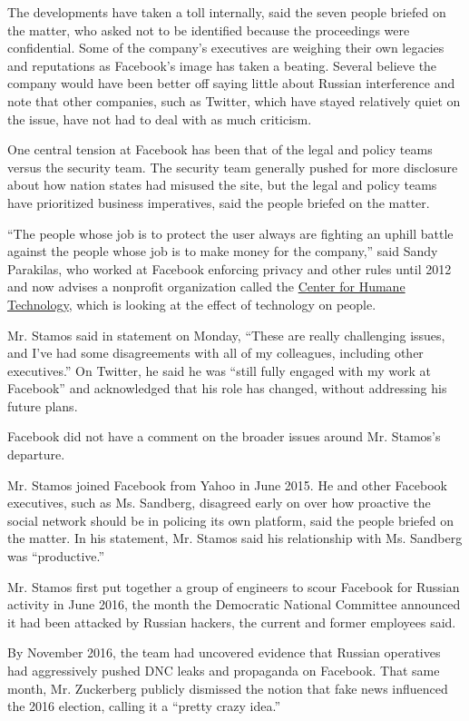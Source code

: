 The developments have taken a toll internally, said the seven people
briefed on the matter, who asked not to be identified because the
proceedings were confidential. Some of the company's executives are
weighing their own legacies and reputations as Facebook's image has
taken a beating. Several believe the company would have been better off
saying little about Russian interference and note that other companies,
such as Twitter, which have stayed relatively quiet on the issue, have
not had to deal with as much criticism.

One central tension at Facebook has been that of the legal and policy
teams versus the security team. The security team generally pushed for
more disclosure about how nation states had misused the site, but the
legal and policy teams have prioritized business imperatives, said the
people briefed on the matter.

``The people whose job is to protect the user always are fighting an
uphill battle against the people whose job is to make money for the
company,'' said Sandy Parakilas, who worked at Facebook enforcing
privacy and other rules until 2012 and now advises a nonprofit
organization called the
\href{https://www.nytimes3xbfgragh.onion/2018/02/04/technology/early-facebook-google-employees-fight-tech.html}{Center
for Humane Technology}, which is looking at the effect of technology on
people.

Mr. Stamos said in statement on Monday, ``These are really challenging
issues, and I've had some disagreements with all of my colleagues,
including other executives.'' On Twitter, he said he was ``still fully
engaged with my work at Facebook'' and acknowledged that his role has
changed, without addressing his future plans.

Facebook did not have a comment on the broader issues around Mr.
Stamos's departure.

Mr. Stamos joined Facebook from Yahoo in June 2015. He and other
Facebook executives, such as Ms. Sandberg, disagreed early on over how
proactive the social network should be in policing its own platform,
said the people briefed on the matter. In his statement, Mr. Stamos said
his relationship with Ms. Sandberg was ``productive.''

Mr. Stamos first put together a group of engineers to scour Facebook for
Russian activity in June 2016, the month the Democratic National
Committee announced it had been attacked by Russian hackers, the current
and former employees said.

By November 2016, the team had uncovered evidence that Russian
operatives had aggressively pushed DNC leaks and propaganda on Facebook.
That same month, Mr. Zuckerberg publicly dismissed the notion that fake
news influenced the 2016 election, calling it a ``pretty crazy idea.''

